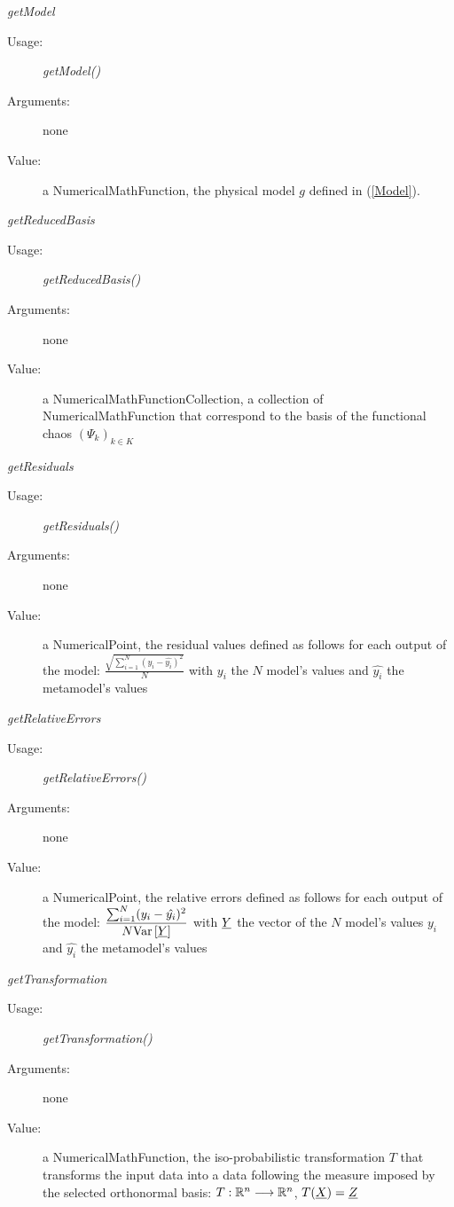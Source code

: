\begin{description}
\begin{description}
\item \textit{getModel}
\begin{description}
\item[Usage:] \textit{getModel()}
\item[Arguments:] none
\item[Value:] a NumericalMathFunction, the physical model $g$ defined in (\ref{Model}).
\end{description}
\bigskip


\item \textit{getReducedBasis}
\begin{description}
\item[Usage:] \textit{getReducedBasis()}
\item[Arguments:] none
\item[Value:] a NumericalMathFunctionCollection, a collection of NumericalMathFunction that correspond to the basis of the functional chaos $(\Psi_k)_{k\in K}$
\end{description}
\bigskip


\item \textit{getResiduals}
\begin{description}
\item[Usage:] \textit{getResiduals()}
\item[Arguments:] none
\item[Value:] a NumericalPoint, the residual values defined as follows for each output of the model:
    $\displaystyle \frac{\sqrt{\sum_{i=1}^N (y_i - \hat{y_i})^2}}{N}$
    with $y_i$ the $N$ model's values and $\hat{y_i}$ the metamodel's values
\end{description}
\bigskip


\item \textit{getRelativeErrors}
\begin{description}
\item[Usage:] \textit{getRelativeErrors()}
\item[Arguments:] none
\item[Value:] a NumericalPoint, the relative errors  defined as follows for each output of the model:
    $\displaystyle \frac{\sum_{i=1}^N (y_i - \hat{y_i})^2}{N {\rm Var}\left[ {\underline{Y}} \right]}$
    with ${\underline{Y}}$ the vector of the $N$ model's values
    $y_i$ and $\hat{y_i}$ the metamodel's values
\end{description}
\bigskip


\item \textit{getTransformation}
\begin{description}
\item[Usage:] \textit{getTransformation()}
\item[Arguments:] none
\item[Value:] a NumericalMathFunction, the iso-probabilistic transformation $T$ that transforms the input data into a data following the measure imposed by the selected orthonormal basis: $T : {\mathbb R}^n \longrightarrow {\mathbb R}^n $, $T({\underline{X}}) = {\underline{Z}}$
\end{description}




\end{description}
\end{description}
